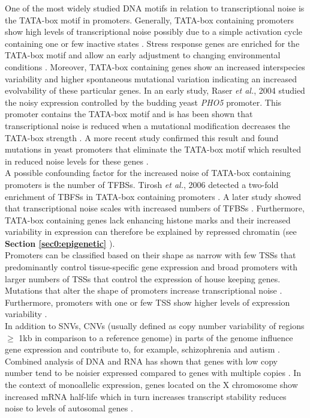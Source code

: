 One of the most widely studied DNA motifs in relation to transcriptional noise is the TATA-box motif in promoters. Generally, TATA-box containing promoters show high levels of transcriptional noise \citep{Faure2017} possibly due to a simple activation cycle containing one or few inactive states \citep{Zoller2015}. Stress response genes are enriched for the TATA-box motif and allow an early adjustment to changing environmental conditions \citep{Lopez-Maury2009}. Moreover, TATA-box containing genes show an increased interspecies variability \citep{Tirosh2006} and higher spontaneous mutational variation \citep{Landry2007} indicating an increased evolvability of these particular genes. In an early study, Raser \textit{et al.}, 2004 studied the noisy expression controlled by the budding yeast \textit{\gls{PHO5}} promoter. This promoter contains the TATA-box motif and is has been shown that transcriptional noise is reduced when a mutational modification decreases the TATA-box strength \citep{Raser2004}. A more recent study confirmed this result and found mutations in yeast promoters that eliminate the TATA-box motif which resulted in reduced noise levels for these genes \citep{Hornung2012}. \\

A possible confounding factor for the increased noise of TATA-box containing promoters is the number of TFBSs. Tirosh \textit{et al.}, 2006 detected a two-fold enrichment of TBFSs in TATA-box containing promoters \citep{Tirosh2006}. A later study showed that transcriptional noise scales with increased numbers of TFBSs \citep{Sharon2014}. Furthermore, TATA-box containing genes lack enhancing histone marks and their increased variability in expression can therefore be explained by repressed chromatin \citep{Choi2008} (see \textbf{Section \ref{sec0:epigenetic}} ).  \\

Promoters can be classified based on their shape as narrow with few \glspl{TSS} that predominantly control tissue-specific gene expression and broad promoters with larger numbers of TSSs that control the expression of house keeping genes. Mutations that alter the shape of promoters increase transcriptional noise \citep{Schor2017a}. Furthermore, promoters with one or few TSS show higher levels of expression variability \citep{Faure2017}.\\

In addition to SNVs, \glspl{CNV} (usually defined as copy number variability of regions $\geq$ 1kb in comparison to a reference genome) in parts of the genome influence gene expression and contribute to, for example, schizophrenia and autism \citep{Gamazon2015}. Combined analysis of DNA and RNA has shown that genes with low copy number tend to be noisier expressed compared to genes with multiple copies \citep{Dey2015}. In the context of monoallelic expression, genes located on the X chromosome show increased mRNA half-life which in turn increases transcript stability reduces noise  to levels of autosomal genes \citep{Faure2017}.


